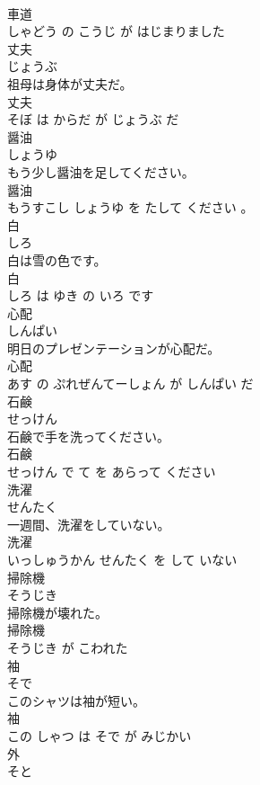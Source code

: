 \documentclass[8pt]{extreport}
\begin{document}
\begin{CJK}{UTF8}{min}
\\	車道 
\\	しゃどう の こうじ が はじまりました			
\\	丈夫	
\\	じょうぶ			
\\	祖母は身体が丈夫だ。	
\\	丈夫 
\\	そぼ は からだ が じょうぶ だ			
\\	醤油	
\\	しょうゆ			
\\	もう少し醤油を足してください。	
\\	醤油 
\\	もうすこし しょうゆ を たして ください 。			
\\	白	
\\	しろ			
\\	白は雪の色です。	
\\	白 
\\	しろ は ゆき の いろ です			
\\	心配	
\\	しんぱい			
\\	明日のプレゼンテーションが心配だ。	
\\	心配 
\\	あす の ぷれぜんてーしょん が しんぱい だ			
\\	石鹸	
\\	せっけん			
\\	石鹸で手を洗ってください。	
\\	石鹸 
\\	せっけん で て を あらって ください			
\\	洗濯	
\\	せんたく			
\\	一週間、洗濯をしていない。	
\\	洗濯 
\\	いっしゅうかん せんたく を して いない			
\\	掃除機	
\\	そうじき			
\\	掃除機が壊れた。	
\\	掃除機 
\\	そうじき が こわれた			
\\	袖	
\\	そで			
\\	このシャツは袖が短い。	
\\	袖 
\\	この しゃつ は そで が みじかい			
\\	外	
\\	そと			

\end{CJK}
\end{document}
